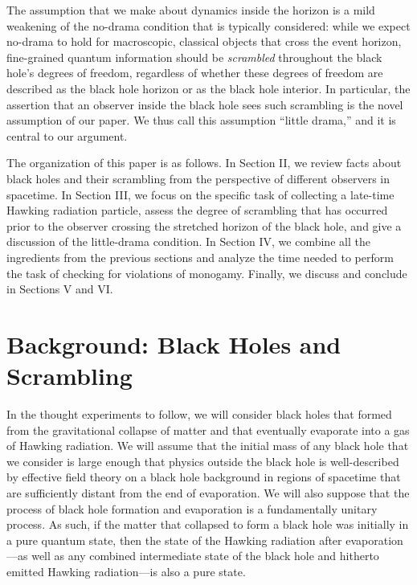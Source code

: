\documentclass[a4paper,11pt]{article}
\theoremstyle{definition}
\begin{document}
The assumption that we make about dynamics inside the horizon is a mild weakening of the no-drama condition that is typically considered: while we expect no-drama to hold for macroscopic, classical objects that cross the
event horizon, fine-grained quantum information should be \emph{scrambled} throughout the black hole's degrees of freedom, regardless of whether these degrees of freedom are described as the black hole horizon or as the black hole interior. In particular, the assertion that an observer inside the black hole sees such scrambling is the novel assumption of our paper. We thus call this assumption ``little drama,'' and it is central to our argument.

The organization of this paper is as follows.
In Section II, we review facts about black holes and their scrambling from the perspective of different observers in spacetime.
In Section III, we focus on the specific task of collecting a late-time Hawking radiation particle, assess the degree of scrambling that has occurred prior to the observer crossing the stretched horizon of the black hole, and give a discussion of the little-drama condition.
In Section IV, we combine all the ingredients from the previous sections and analyze the time needed to perform the task of checking for violations of monogamy. Finally, we discuss and conclude in Sections V and VI.




\section{Background: Black Holes and Scrambling} \label{sec:scrambling}



In the thought experiments to follow, we will consider black holes that formed from the gravitational collapse of matter and that eventually evaporate into a gas of Hawking radiation. 
We will assume that the initial mass of any black hole that we consider is large enough that physics outside the black hole is well-described by effective field theory on a black hole background in regions of spacetime that are sufficiently distant from the end of evaporation.
We will also suppose that the process of black hole formation and evaporation is a fundamentally unitary process.
As such, if the matter that collapsed to form a black hole was initially in a pure quantum state, then the state of the Hawking radiation after evaporation---as well as any combined intermediate state of the black hole and hitherto emitted Hawking radiation---is also a pure state.
\end{document}
